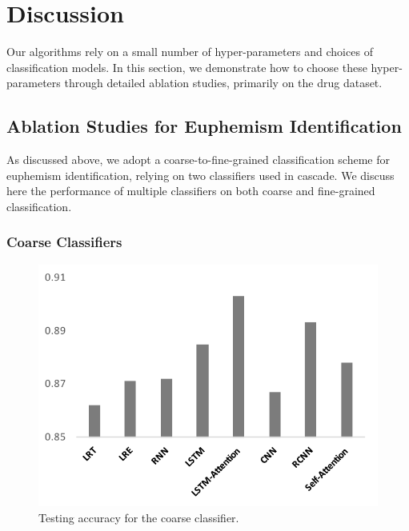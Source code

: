 \section{Discussion}
\label{sec:dis}
Our algorithms rely on a small number of hyper-parameters and choices of classification models. 
In this  section, we demonstrate how to choose these hyper-parameters through detailed ablation studies, primarily on  the drug dataset.

\subsection{Ablation Studies for Euphemism Identification}
As discussed above, we adopt a coarse-to-fine-grained classification scheme for euphemism identification, relying on two classifiers used in cascade. 
We discuss here the performance of multiple classifiers on both coarse and fine-grained classification. 

\subsubsection{Coarse Classifiers}
\label{sec:ablation_coarse}
\begin{figure}[ht!]
	\centering
	\includegraphics[width=0.7\linewidth]{figures/11}
	\caption{Testing accuracy for the coarse classifier.}
	\label{fig:11}
\end{figure}

